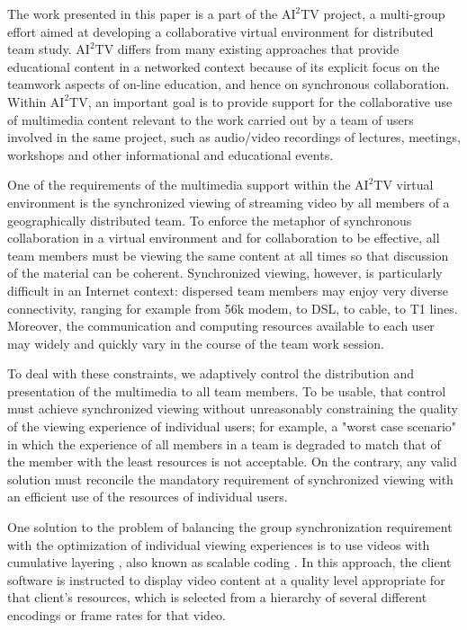 \documentclass{sig-alternate}
\begin{document}
The work presented in this paper is a part of the $\mathrm{AI}^2$TV
project, a multi-group effort aimed at developing a collaborative
virtual environment for distributed team study.  $\mathrm{AI}^2$TV
differs from many existing approaches that provide educational content
in a networked context because of its explicit focus on the teamwork
aspects of on-line education, and hence on synchronous collaboration.
Within $\mathrm{AI}^2$TV, an important goal is to provide support for
the collaborative use of multimedia content relevant to the work
carried out by a team of users involved in the same project, such as
audio/video recordings of lectures, meetings, workshops and other
informational and educational events.

One of the requirements of the multimedia support within the
$\mathrm{AI}^2$TV virtual environment is the synchronized viewing of
streaming video by all members of a geographically distributed team.
To enforce the metaphor of synchronous collaboration in a virtual
environment and for collaboration to be effective, all team members
must be viewing the same content at all times so that discussion of
the material can be coherent.  Synchronized viewing, however, is
particularly difficult in an Internet context: dispersed team members
may enjoy very diverse connectivity, ranging for example from 56k
modem, to DSL, to cable, to T1 lines.  Moreover, the communication and
computing resources available to each user may widely and quickly vary
in the course of the team work session.

To deal with these constraints, we adaptively control the distribution
and presentation of the multimedia to all team members.  To be usable,
that control must achieve synchronized viewing without unreasonably
constraining the quality of the viewing experience of individual
users; for example, a "worst case scenario" in which the experience of
all members in a team is degraded to match that of the member with the
least resources is not acceptable. On the contrary, any valid solution
must reconcile the mandatory requirement of synchronized viewing with
an efficient use of the resources of individual users.

One solution to the problem of balancing the group synchronization
requirement with the optimization of individual viewing experiences is
to use videos with cumulative layering \cite{MCCANNE}, also known as
scalable coding \cite{LI}.  In this approach, the client software is
instructed to display video content at a quality level appropriate for
that client's resources, which is selected from a hierarchy of several
different encodings or frame rates for that video.
\end{document}
